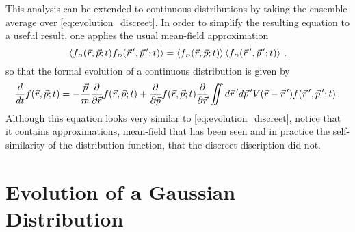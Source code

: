 This analysis can be extended to continuous distributions by taking the ensemble average over \ref{eq:evolution_discreet}.
In order to simplify the resulting equation to a useful result, one applies the usual mean-field approximation
\begin{equation}
  \left < f_{{\scriptscriptstyle D}} (\vec{r}, \vec{p}; t) f_{{\scriptscriptstyle D}} (\vec{r}\,^{\prime}, \vec{p}\,^{\prime}; t) \right > = \left < f_{{\scriptscriptstyle D}} (\vec{r}, \vec{p}; t) \right > \left < f_{{\scriptscriptstyle D}} (\vec{r}\,^{\prime}, \vec{p}\,^{\prime}; t) \right > \,\text{,}
\end{equation}
so that the formal evolution of a continuous distribution is given by
\begin{equation} \label{eq:formal_evolution}
  \frac{d}{dt} f(\vec{r}, \vec{p}; t) =
  -\frac{\vec{p}}{m} \frac{\partial}{\partial \vec{r}} f(\vec{r}, \vec{p}; t)
  + \frac{\partial}{\partial \vec{p}} f (\vec{r}, \vec{p}; t)
  \frac{\partial}{\partial \vec{r}} \iint d\vec{r}\,^{\prime} d\vec{p}\,^{\prime} V(\vec{r} - \vec{r}\,^{\prime}) f(\vec{r}\,^{\prime},\vec{p}\,^{\prime};t) \,\text{.}
\end{equation}
Although this equation looks very similar to \ref{eq:evolution_discreet}, notice that it contains approximations, mean-field that has been seen and in practice the self-similarity of the distribution function, that the discreet discription did not.

\section{Evolution of a Gaussian Distribution}

